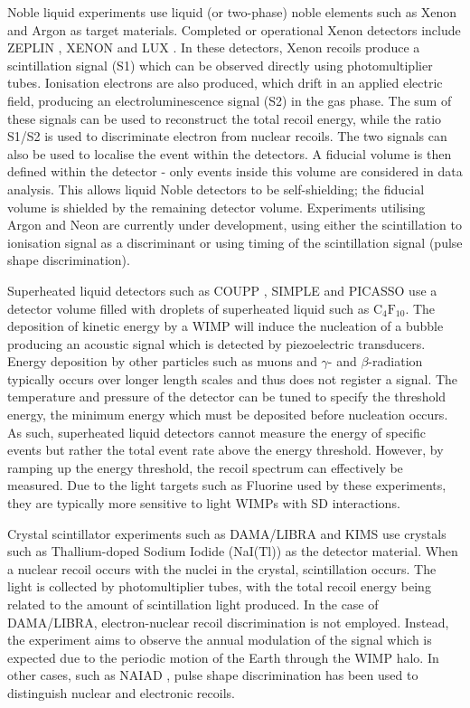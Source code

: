 Noble liquid experiments use liquid (or two-phase) noble elements such as Xenon and Argon as target materials. Completed or operational Xenon detectors include ZEPLIN \cite{Akimov:2012}, XENON \cite{Aprile:2011} and LUX \cite{Akerib:2014}. In these detectors, Xenon recoils produce a scintillation signal (S1) which can be observed directly using photomultiplier tubes. Ionisation electrons are also produced, which drift in an applied electric field, producing an electroluminescence signal (S2) in the gas phase. The sum of these signals can be used to reconstruct the total recoil energy, while the ratio S1/S2 is used to discriminate electron from nuclear recoils. The two signals can also be used to localise the event within the detectors. A fiducial volume is then defined within the detector - only events inside this volume are considered in data analysis. This allows liquid Noble detectors to be self-shielding; the fiducial volume is shielded by the remaining detector volume. Experiments utilising Argon \cite{Marchionni:2011, Badertscher:2013} and Neon \cite{Boulay:2008} are currently under development, using either the scintillation to ionisation signal as a discriminant or using timing of the scintillation signal (pulse shape discrimination).

Superheated liquid detectors such as COUPP \cite{Behnke:2011}, SIMPLE \cite{Felizardo:2012} and PICASSO \cite{Archambault:2012} use a detector volume filled with droplets of superheated liquid such as $\textrm{C}_4\textrm{F}_{10}$. The deposition of kinetic energy by a WIMP will induce the nucleation of a bubble producing an acoustic signal which is detected by piezoelectric transducers. Energy deposition by other particles such as muons and $\gamma$- and $\beta$-radiation typically occurs over longer length scales and thus does not register a signal. The temperature and pressure of the detector can be tuned to specify the threshold energy, the minimum energy which must be deposited before nucleation occurs. As such, superheated liquid detectors cannot measure the energy of specific events but rather the total event rate above the energy threshold. However, by ramping up the energy threshold, the recoil spectrum can effectively be measured. Due to the light targets such as Fluorine used by these experiments, they are typically more sensitive to light WIMPs with SD interactions.

Crystal scintillator experiments \cite{Kim:2010} such as DAMA/LIBRA \cite{Bernabei:2008a,Bernabei:2010,Bernabei:2013} and KIMS \cite{Lee:2007} use crystals such as Thallium-doped Sodium Iodide (NaI(Tl)) as the detector material. When a nuclear recoil occurs with the nuclei in the crystal, scintillation occurs. The light is collected by photomultiplier tubes, with the total recoil energy being related to the amount of scintillation light produced. In the case of DAMA/LIBRA, electron-nuclear recoil discrimination is not employed. Instead, the experiment aims to observe the annual modulation of the signal which is expected due to the periodic motion of the Earth through the WIMP halo. In other cases, such as NAIAD \cite{Ahmed:2003}, pulse shape discrimination has been used to distinguish nuclear and electronic recoils.

